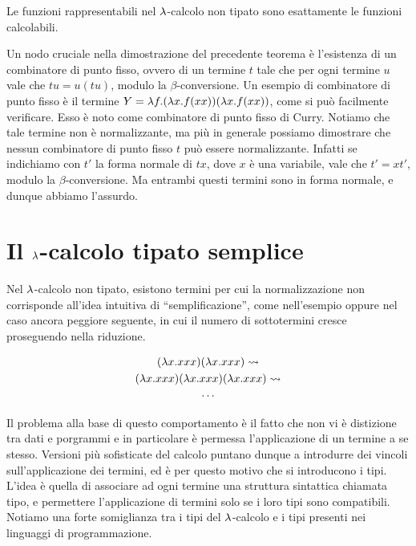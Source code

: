 \documentclass[]{marticle}
\begin{document}
\begin{block}[Teorema]
    Le funzioni rappresentabili nel $\lambda$-calcolo non tipato sono esattamente le
    funzioni calcolabili.
\end{block}

Un nodo cruciale nella dimostrazione del precedente teorema \`e l'esistenza di
un combinatore di punto fisso, ovvero di un termine $t$ tale che per ogni
termine $u$ vale che $tu = u(tu)$, modulo la $\beta$-conversione. Un esempio di
combinatore di punto fisso \`e il termine $Y = \lambda f. (\lambda x. f(xx))(\lambda x.
f(xx))$, come si pu\`o facilmente verificare. Esso \`e noto come combinatore di
punto fisso di Curry. Notiamo che tale termine non \`e normalizzante, ma pi\`u
in generale possiamo dimostrare che nessun combinatore di punto fisso $t$ pu\`o
essere normalizzante.  Infatti se indichiamo con $t'$ la forma normale di $tx$,
dove $x$ \`e una variabile, vale che $t' = xt'$, modulo la $\beta$-conversione.
Ma entrambi questi termini sono in forma normale, e dunque abbiamo l'assurdo.

\section{Il $\lambda$-calcolo tipato semplice}

Nel $\lambda$-calcolo non tipato, esistono termini per cui la normalizzazione non
corrisponde all'idea intuitiva di ``semplificazione'', come
nell'esempio  oppure nel caso ancora peggiore seguente,
in cui il numero di sottotermini cresce proseguendo nella riduzione.

\begin{block}[Esempio]
    \begin{gather*}
        (\lambda x. xxx)(\lambda x. xxx) \rightsquigarrow \\
        (\lambda x. xxx)(\lambda x. xxx)(\lambda x. xxx)\rightsquigarrow \\
        \cdots
    \end{gather*}
\end{block} 

Il problema alla base di questo comportamento \`e il fatto che non vi \`e
distizione tra dati e porgrammi e in particolare \`e permessa l'applicazione di
un termine a se stesso. Versioni pi\`u sofisticate del calcolo puntano dunque a
introdurre dei vincoli sull'applicazione dei termini, ed \`e per questo motivo
che si introducono i tipi. L'idea \`e quella di associare ad ogni termine una
struttura sintattica chiamata tipo, e permettere l'applicazione di termini solo
se i loro tipi sono compatibili. Notiamo una forte somiglianza tra i tipi del
$\lambda$-calcolo e i tipi presenti nei linguaggi di programmazione.
\end{document}
